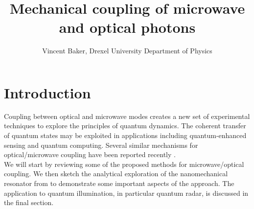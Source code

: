 \documentclass[a4paper,11pt, twocolumn]{article}
\title{Mechanical coupling of microwave and optical photons}
\author{Vincent Baker, Drexel University Department of Physics}
\numberwithin{equation}{section}
\begin{document}
\section{Introduction}
Coupling between optical and microwave modes creates a new set of experimental techniques to explore the principles of quantum dynamics.
The coherent transfer of quantum states may be exploited in applications including quantum-enhanced sensing and quantum computing.
Several similar mechanisms for optical/microwave coupling have been reported recently \cite{nanoCrystal, nanoMR}.\\
We will start by reviewing some of the proposed methods for microwave/optical coupling.
We then sketch the analytical exploration of the nanomechanical resonator from \cite{nanoMR} to demonstrate some important aspects of the approach. 
The application to quantum illumination, in particular quantum radar, is discussed in the final section.
\end{document}
